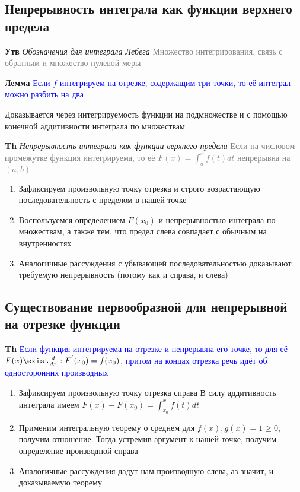\documentclass[a4paper, 14pt]{article}
\begin{document}
    \subsection{Непрерывность интеграла как функции верхнего предела}
    
    \textbf{Утв} \textit{Обозначения для интеграла Лебега} \textcolor{gray}{Множество интегрирования, связь с
    обратным и множество нулевой меры}
    
    \textbf{Лемма} \textcolor{blue}{Если $f$ интегрируем на отрезке, содержащим три точки, то её интеграл можно разбить
    на два}
    
    Доказывается через интегрируемость функции на подмножестве и с помощью конечной аддитивности интеграла по множествам
    
    \textbf{Th} \textit{Непрерывность интеграла как функции верхнего предела} \textcolor{gray}{Если на числовом
    промежутке функция интегрируема, то её $F(x) = \int_a^x f(t)dt$ непрерывна на $(a, b)$}
    
    \begin{enumerate}
        \item Зафиксируем произвольную точку отрезка и строго возрастающую последовательность с пределом в нашей точке
        \item Воспользуемся определением $F(x_0)$ и непрерывностью интеграла по множествам, а также тем, что
        предел слева совпадает с обычным на внутренностях
        \item Аналогичные рассуждения с убывающей последовательностью доказывают требуемую непрерывность (потому как и
        справа, и слева)
    \end{enumerate}
    
    \subsection{Существование первообразной для непрерывной на отрезке функции}
    
    \textbf{Th} \textcolor{blue}{Если функция интегрируема на отрезке и непрерывна его точке, то для её $
    F(x) \exist \frac{d}{dx}: F^{'}(x_0) = f(x_0)$, притом на концах отрезка речь идёт об односторонних производных}
    
    \begin{enumerate}
        \item Зафиксируем произвольную точку отрезка справа
        В силу аддитивность интеграла имеем $F(x) - F(x_0) = \int_{x_0}^x f(t)dt$
        \item Применим интегральную теорему о среднем для $f(x), g(x) = 1 \geq 0$, получим отношение.
        Тогда устремив аргумент к нашей точке, получим определение производной справа
        \item Аналогичные рассуждения дадут нам производную слева, аз значит, и доказываемую теорему
    \end{enumerate}
    
\end{document}
